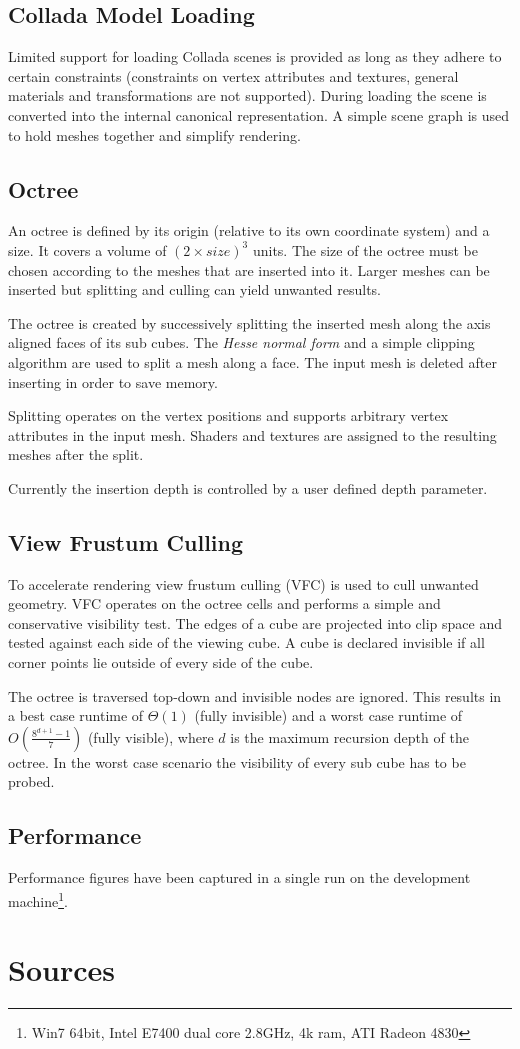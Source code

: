 \documentclass[a4, 12pt]{scrartcl}
\begin{document}
\subsection{Collada Model Loading}
Limited support for loading Collada scenes is provided as long as they adhere to certain constraints (constraints on vertex attributes and textures, general materials and transformations are not supported). During loading the scene is converted into the internal canonical representation. A simple scene graph is used to hold meshes together and simplify rendering.

\subsection{Octree}
An octree is defined by its origin (relative to its own coordinate system) and a size. It covers a volume of $(2 \times size )^3$ units. The size of the octree must be chosen according to the meshes that are inserted into it. Larger meshes can be inserted but splitting and culling can yield unwanted results.

The octree is created by successively splitting the inserted mesh along the axis aligned faces of its sub cubes. The \emph{Hesse normal form} and a simple clipping algorithm are used to split a mesh along a face. The input mesh is deleted after inserting in order to save memory.

Splitting operates on the vertex positions and supports arbitrary vertex attributes in the input mesh. Shaders and textures are assigned to the resulting meshes after the split.

Currently the insertion depth is controlled by a user defined depth parameter. 

\subsection{View Frustum Culling}
To accelerate rendering view frustum culling (VFC) is used to cull unwanted geometry. VFC operates on the octree cells and performs a simple and conservative visibility test. The edges of a cube are projected into clip space and tested against each side of the viewing cube. A cube is declared invisible if all corner points lie outside of every side of the cube. 

The octree is traversed top-down and invisible nodes are ignored. This results in a best case runtime of $\Theta(1)$ (fully invisible) and a worst case runtime of $O(\frac{8^{d+1} - 1}{7})$ (fully visible), where $d$ is the maximum recursion depth of the octree. In the worst case scenario the visibility of every sub cube has to be probed.

\subsection{Performance}
Performance figures have been captured in a single run on the development machine\footnote{Win7 64bit, Intel E7400 dual core 2.8GHz, 4k ram, ATI Radeon 4830}.






\section{Sources}






\end{document}
